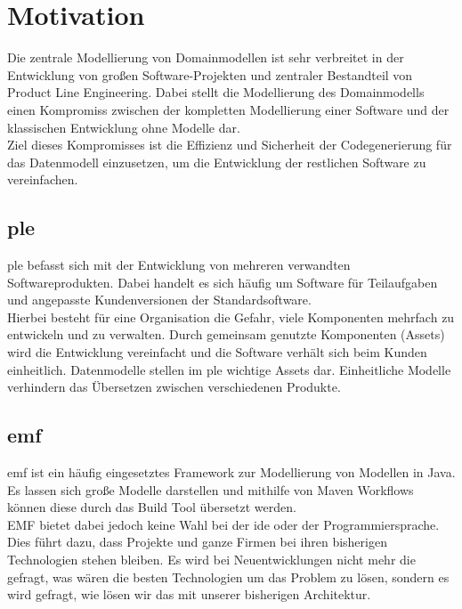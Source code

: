 \documentclass[./einleitung.tex]{subfiles}
\begin{document}
\section{Motivation}\label{sec:motivation}
Die zentrale Modellierung von Domainmodellen ist sehr verbreitet in der Entwicklung von großen Software-Projekten und zentraler Bestandteil von Product Line Engineering.
Dabei stellt die Modellierung des Domainmodells einen Kompromiss zwischen der kompletten Modellierung einer Software und der klassischen Entwicklung ohne Modelle dar. \\
Ziel dieses Kompromisses ist die Effizienz und Sicherheit der Codegenerierung für das Datenmodell einzusetzen, um die Entwicklung der restlichen Software zu vereinfachen.

\subsection{\acrfull{ple}}\label{subsec:ple}
\acrshort{ple} befasst sich mit der Entwicklung von mehreren verwandten Softwareprodukten.
Dabei handelt es sich häufig um Software für Teilaufgaben und angepasste Kundenversionen der Standardsoftware. \\
Hierbei besteht für eine Organisation die Gefahr, viele Komponenten mehrfach zu entwickeln und zu verwalten.
Durch gemeinsam genutzte Komponenten (Assets) wird die Entwicklung vereinfacht und die Software verhält sich beim Kunden einheitlich.
Datenmodelle stellen im \acrshort{ple} wichtige Assets dar.
Einheitliche Modelle verhindern das Übersetzen zwischen verschiedenen Produkte.

\subsection{\acrshort{emf}}\label{subsec:emf}
\acrfull{emf} ist ein häufig eingesetztes Framework zur Modellierung von Modellen in Java.
Es lassen sich große Modelle darstellen und mithilfe von Maven Workflows können diese durch das Build Tool übersetzt werden. \\
EMF bietet dabei jedoch keine Wahl bei der \acrshort{ide} oder der Programmiersprache.
Dies führt dazu, dass Projekte und ganze Firmen bei ihren bisherigen Technologien stehen bleiben.
Es wird bei Neuentwicklungen nicht mehr die gefragt, was wären die besten Technologien um das Problem zu lösen, sondern es wird gefragt, wie lösen wir das mit unserer bisherigen Architektur.
\end{document}
